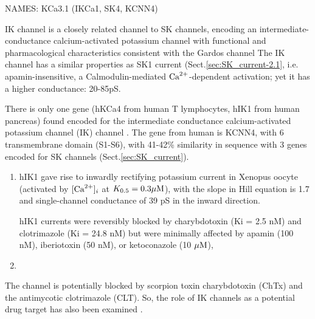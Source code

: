 NAMES: KCa3.1 (IKCa1, SK4, KCNN4)

IK channel is a closely related channel to SK channels, encoding an
intermediate-conductance calcium-activated potassium channel with functional and
pharmacological characteristics consistent with the Gardos channel The IK
channel has a similar properties as SK1 current (Sect.\ref{sec:SK_current-2.1},
i.e. apamin-insensitive, a Calmodulin-mediated ${\text{Ca}^{2+}}$-dependent activation; yet
it has a higher conductance: 20-85pS.


There is only one gene (hKCa4 from  human T lymphocytes, hIK1 from human
pancreas) found encoded for the  intermediate conductance calcium-activated
potassium channel (IK) channel \citep{ishii1997, logdson1997}.
The gene from human is KCNN4, with 6 transmembrane domain (S1-S6), with 41-42\%
similarity in sequence with 3 genes encoded for SK channels
(Sect.\ref{sec:SK_current}). 
\begin{enumerate}

  \item hIK1 gave rise to inwardly rectifying potassium current in Xenopus
  oocyte (activated by $[{\text{Ca}^{2+}}]_i$ at $K_{0.5} = 0.3 {\mu\text{M}}$), with the slope in
  Hill equation is 1.7 and single-channel conductance of 39 pS in the inward
  direction.
  
   hIK1 currents were reversibly blocked by charybdotoxin (Ki = 2.5 nM) and
  clotrimazole (Ki = 24.8 nM) but were minimally affected by apamin (100 nM),
  iberiotoxin (50 nM), or ketoconazole (10 ${\mu\text{M}}$),
  
  \item 
\end{enumerate}
The channel is potentially blocked by scorpion toxin charybdotoxin (ChTx) and the antimycotic
clotrimazole (CLT). So, the role of IK channels as a potential drug target has
also been examined \citep{jensen2001, jensen2002}.


